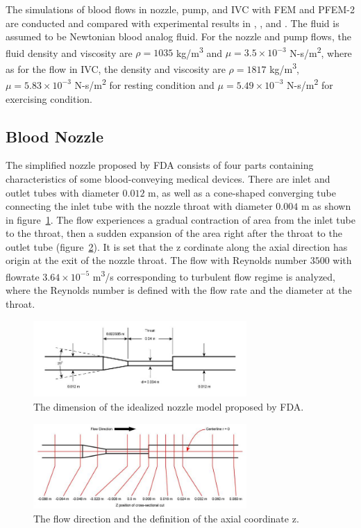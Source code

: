 The simulations of blood flows in nozzle, pump, and IVC with FEM and PFEM-2 are conducted and compared with experimental results in \cite{fda_res}, \cite{fda_nozzle}, \cite{fda_pump} and \cite{gallagher_exp}. The fluid is assumed to be Newtonian blood analog fluid. For the nozzle and pump flows, the fluid density and viscosity are $\rho= 1035$ kg/m\textsuperscript{3} and $\mu =3.5\times10^{-3}$ N-s/m\textsuperscript{2}, where as for the flow in IVC, the density and viscosity are $\rho=1817$ kg/m\textsuperscript{3}, $\mu=5.83\times10^{-3}$ N-s/m\textsuperscript{2} for resting condition and $\mu=5.49\times10^{-3}$ N-s/m\textsuperscript{2} for exercising condition. 

\subsection{Blood Nozzle}

The simplified nozzle proposed by FDA consists of four parts containing characteristics of some blood-conveying medical devices. There are inlet and outlet tubes with diameter $0.012$ m, as well as a cone-shaped converging tube connecting the inlet tube with the nozzle throat with diameter $0.004$ m as shown in figure~\ref{fig:nozzlegeo1}. The flow experiences a gradual contraction of area from the inlet tube to the throat, then a sudden expansion of the area right after the throat to the outlet tube (figure~\ref{fig:nozzlegeo2}). It is set that the z cordinate along the axial direction has origin at the exit of the nozzle throat. The flow with Reynolds number $3500$ with flowrate $3.64\times10^{-5}$ m\textsuperscript{3}/s corresponding to turbulent flow regime is analyzed, where the Reynolds number is defined with the flow rate and the diameter at the throat. 

\begin{figure}[htbp]
    \centering
    \includegraphics[width=3.2in]{imgs/nozzle_pump/nozzle_geo.jpg}
    \caption{The dimension of the idealized nozzle model proposed by FDA.}
    \label{fig:nozzlegeo1}
\end{figure}
\begin{figure}[htbp]
    \centering
    \includegraphics[width=3.2in]{imgs/nozzle_pump/nozzle_CS.jpg}
    \caption{The flow direction and the definition of the axial coordinate z.}
    \label{fig:nozzlegeo2}
\end{figure}

